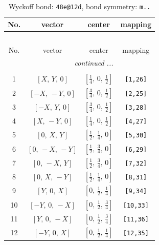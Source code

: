 \documentclass[fleqn,8pt]{jsarticle}
\begin{document}
\begin{longtable}{cccc}
\caption{Wyckoff bond: {\tt 48e@12d}, bond symmetry: {\tt m..}}
 \\
 \hline \hline
No. & vector & center & mapping \\ \hline \endfirsthead

\multicolumn{3}{l}{\tablename\ \thetable{}} \\
 \hline \hline
No. & vector & center & mapping \\ \hline \endhead

 \hline \hline
\multicolumn{3}{r}{\footnotesize\it continued ...} \\ \endfoot

 \hline \hline
\multicolumn{3}{r}{} \\ \endlastfoot

1 & $\left[ X,\, Y,\, 0 \right]$ & $\left[ \frac{1}{4},\, 0,\, \frac{1}{2} \right]$ & {\tt [1,26]} \\ \hline
2 & $\left[ - X,\, - Y,\, 0 \right]$ & $\left[ \frac{3}{4},\, 0,\, \frac{1}{2} \right]$ & {\tt [2,25]} \\ \hline
3 & $\left[ - X,\, Y,\, 0 \right]$ & $\left[ \frac{3}{4},\, 0,\, \frac{1}{2} \right]$ & {\tt [3,28]} \\ \hline
4 & $\left[ X,\, - Y,\, 0 \right]$ & $\left[ \frac{1}{4},\, 0,\, \frac{1}{2} \right]$ & {\tt [4,27]} \\ \hline
5 & $\left[ 0,\, X,\, Y \right]$ & $\left[ \frac{1}{2},\, \frac{1}{4},\, 0 \right]$ & {\tt [5,30]} \\ \hline
6 & $\left[ 0,\, - X,\, - Y \right]$ & $\left[ \frac{1}{2},\, \frac{3}{4},\, 0 \right]$ & {\tt [6,29]} \\ \hline
7 & $\left[ 0,\, - X,\, Y \right]$ & $\left[ \frac{1}{2},\, \frac{3}{4},\, 0 \right]$ & {\tt [7,32]} \\ \hline
8 & $\left[ 0,\, X,\, - Y \right]$ & $\left[ \frac{1}{2},\, \frac{1}{4},\, 0 \right]$ & {\tt [8,31]} \\ \hline
9 & $\left[ Y,\, 0,\, X \right]$ & $\left[ 0,\, \frac{1}{2},\, \frac{1}{4} \right]$ & {\tt [9,34]} \\ \hline
10 & $\left[ - Y,\, 0,\, - X \right]$ & $\left[ 0,\, \frac{1}{2},\, \frac{3}{4} \right]$ & {\tt [10,33]} \\ \hline
11 & $\left[ Y,\, 0,\, - X \right]$ & $\left[ 0,\, \frac{1}{2},\, \frac{3}{4} \right]$ & {\tt [11,36]} \\ \hline
12 & $\left[ - Y,\, 0,\, X \right]$ & $\left[ 0,\, \frac{1}{2},\, \frac{1}{4} \right]$ & {\tt [12,35]} \\ \hline

\end{longtable}
\end{document}
